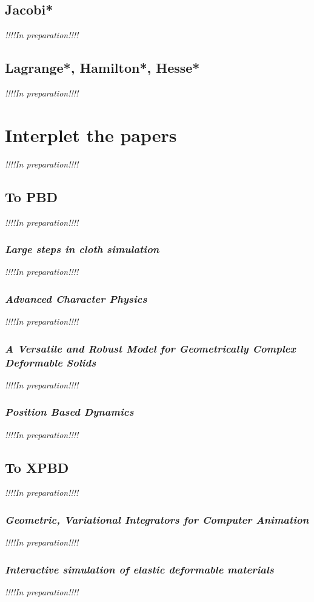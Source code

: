 \documentclass[pdflatex,sn-mathphys-num]{sn-jnl}%
\theoremstyle{thmstyleone}%
\theoremstyle{thmstyletwo}%
\theoremstyle{thmstylethree}%
\newcommand{\inprep}{
	\begin{center}
		\sl\rm {!!!!In preparation!!!!}
\end{center}}
\begin{document}
\subsection{Jacobi*}
\inprep
\subsection{Lagrange*, Hamilton*, Hesse*}
\inprep

\section{Interplet the papers}
\inprep
\subsection{To PBD}
\inprep
\subsubsection{{\sl Large steps in cloth simulation}\cite{LargeStepBaraff}}
\inprep
\subsubsection{{\sl Advanced Character Physics}\cite{Jakobsen2003AdvancedCP}}
\inprep
\subsubsection{\small{\sl A Versatile and Robust Model for Geometrically Complex Deformable Solids}\cite{VersatileTeschner}}
\inprep
\subsubsection{{\sl Position Based Dynamics}\cite{PBD}}
\inprep

\subsection{To XPBD}
\inprep
\subsubsection{{\sl Geometric, Variational Integrators for Computer Animation}\cite{VariationalIntegrators2006}}
\inprep
\subsubsection{{\sl Interactive simulation of elastic deformable materials}\cite{Servin2006InteractiveSO}}
\inprep
\end{document}
